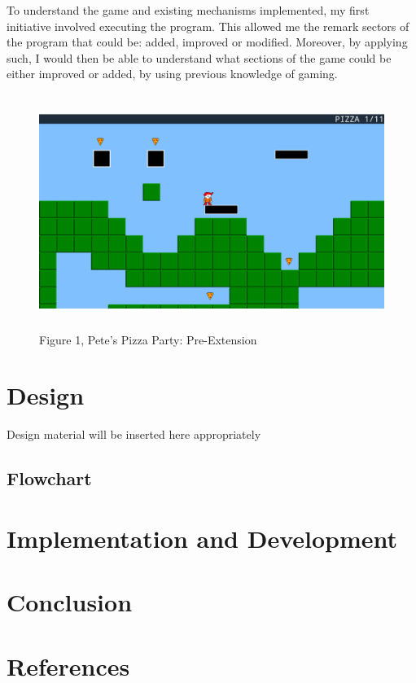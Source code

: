 \documentclass{article}
\begin{document}
To understand the game and existing mechanisms implemented, my first initiative involved executing the program. This allowed me the remark sectors of the program that could be: added, improved or modified. Moreover, by applying such, I would then be able to understand what sections of the game could be either improved or added, by using previous knowledge of gaming.
\begin{figure}[H]
    \centering
    \includegraphics[height=3in]{figure1.png}
    \caption[]{Figure 1, Pete's Pizza Party: Pre-Extension}
    \label{fig:pete's pizza party}
\end{figure}


\section{Design}\label{sec:design}
Design material will be inserted here appropriately
\subsection{Flowchart}\label{sec:subsec1}

\section{Implementation and Development}


\section{Conclusion}
\cleardoublepage
\section*{References}
\end{document}
